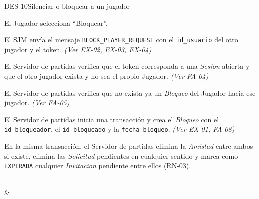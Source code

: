 \begin{fichacu}{DES-10}{Silenciar o bloquear a un jugador}
{\begin{cuenum}[start=1]
      \item El Jugador selecciona ``Bloquear''.
      \item El SJM envía el mensaje \texttt{BLOCK\_\allowbreak{}PLAYER\_\allowbreak{}REQUEST} con el \texttt{id\_\allowbreak{}usuario} del otro jugador y el token. \textit{(Ver \mbox{EX-02}, \mbox{EX-03}, \mbox{EX-04})}
      \item El Servidor de partidas verifica que el token corresponda a una \textit{Sesion} abierta y que el otro jugador exista y no sea el propio Jugador. \textit{(Ver \mbox{FA-04})}
      \item El Servidor de partidas verifica que no exista ya un \textit{Bloqueo} del Jugador hacia ese jugador. \textit{(Ver \mbox{FA-05})}
      \item El Servidor de partidas inicia una transacción y crea el \textit{Bloqueo} con el \texttt{id\_\allowbreak{}bloqueador}, el \texttt{id\_\allowbreak{}bloqueado} y la \texttt{fecha\_\allowbreak{}bloqueo}. \textit{(Ver \mbox{EX-01}, \mbox{FA-08})}
      \item En la misma transacción, el Servidor de partidas elimina la \textit{Amistad} entre ambos si existe, elimina las \textit{Solicitud} pendientes en cualquier sentido y marca como \texttt{EXPIRADA} cualquier \textit{Invitacion} pendiente entre ellos (\mbox{RN-03}).
    \end{cuenum}} \\
   &  \\ \hline

\end{fichacu}

